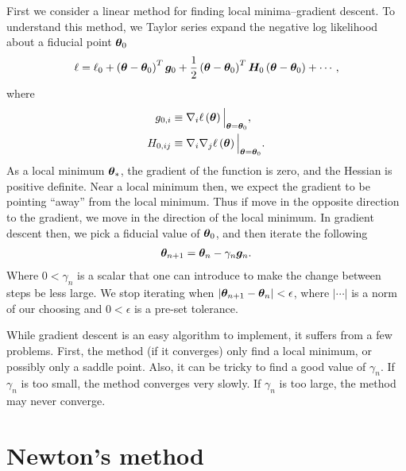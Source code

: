 First we consider a linear method for finding local minima--gradient descent.
To understand this method, we Taylor series expand the negative log likelihood
about a fiducial point ${\bm \theta}_0$
\begin{align}
    \label{eq:quadratic-taylor-vector}
    \ell 
    =
    \ell_0
    +
    \left({\bm \theta}-{\bm \theta}_0\right)^T{\bm g}_0
    +
    \frac{1}{2}\left({\bm \theta}-{\bm \theta}_0\right)^T {\bm H}_0 \left({\bm \theta}-{\bm \theta}_0\right) 
    +
    \cdots
    ,
\end{align}
where
\begin{align}
    g_{0,i}
    &\equiv
    \nabla_i\ell\left({\bm \theta}\right)\Big|_{{\bm \theta}={\bm \theta}_0}
    ,\\
    H_{0,ij}
    &\equiv
    \nabla_i\nabla_j\ell\left({\bm \theta}\right)
    \Big|_{{\bm \theta}={\bm \theta}_0}
    .
\end{align}
As a local minimum ${\bm \theta}_*$, the gradient of the function is zero, and
the Hessian is positive definite. 
Near a local minimum then, we expect the gradient to be pointing ``away''
from the local minimum.
Thus if move in the opposite direction to the gradient, we move in the direction
of the local minimum.
In gradient descent then, we pick a fiducial value of ${\bm \theta}_0$, and then
iterate the following
\begin{align}
    {\bm \theta}_{n+1}
    =
    {\bm \theta}_n
    -
    \gamma_n {\bm g}_n
    .
\end{align}
Where $0<\gamma_n$
is a scalar that one can introduce to make the change between steps be less large.
We stop iterating when $\left|{\bm \theta}_{n+1}-{\bm \theta}_n\right|<\epsilon$, where
$\left|\cdots\right|$ is a norm of our choosing and $0<\epsilon$ is a pre-set tolerance.

While gradient descent is an easy algorithm to implement, it suffers from a
few problems. First, the method (if it converges) only find a local minimum,
or possibly only a saddle point.
Also, it can be tricky to find a good value of $\gamma_n$. 
If $\gamma_n$ is too small, the method converges very slowly.
If $\gamma_n$ is too large, the method may never converge.

\section{Newton's method\label{sec:newtons-method}}

